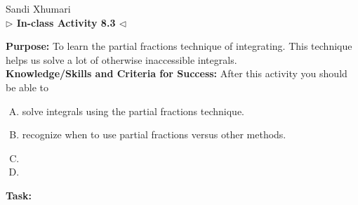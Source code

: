 \documentclass[answers]{exam}
\begin{document}
	\begin{center}
	\hfill Sandi Xhumari \\ \textbf{$\triangleright$ In-class Activity 8.3 $\triangleleft$}\\
\end{center}

\textbf{Purpose:} To learn the partial fractions technique of integrating. This technique helps us solve a lot of otherwise inaccessible integrals. \\

\textbf{Knowledge/Skills and Criteria for Success:} After this activity you should be able to

\begin{enumerate}[A.]
	\item solve integrals using the partial fractions technique.
	\item recognize when to use partial fractions versus other methods.
	\item
	\item
	
\end{enumerate}

\textbf{Task:}
\end{document}
